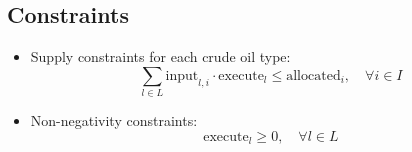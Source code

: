 \documentclass{article}
\begin{document}
\subsection*{Constraints}

\begin{itemize}
    \item Supply constraints for each crude oil type:
    \[
    \sum_{l \in L} \text{input}_{l,i} \cdot \text{execute}_l \leq \text{allocated}_i, \quad \forall i \in I
    \]

    \item Non-negativity constraints:
    \[
    \text{execute}_l \geq 0, \quad \forall l \in L
    \]
\end{itemize}
\end{document}
